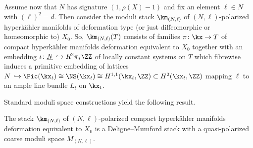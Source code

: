 \subsection{}
Assume now that $N$ has signature $(1,\rho(X)-1)$ and fix an element $\ell\in N$ with $(\ell)^2=d$. Then consider the moduli stack $\km_{(N,\ell)}$ of $(N,\ell)$-polarized hyperk\"ahler manifolds of deformation type (or just diffeomorphic or homeomorphic to) $X_0$. So, $\km_{(N,\ell)}(T)$ consists of families $\pi\colon\kx\to T$ of compact hyperk\"ahler manifolds deformation equivalent to $X_0$ together with an embedding $\iota\colon\underline N\,\hookrightarrow R^2\pi_*\ZZ$ of locally constant systems on $T$ which fibrewise induces a primitive embedding of lattices $N\,\hookrightarrow \Pic(\kx_t)\cong\NS(\kx_t)\cong H^{1,1}(\kx_t,\ZZ)\subset H^2(\kx_t,\ZZ)$ mapping $\ell$ to an ample line bundle $L_t$ on $\kx_t$.

Standard moduli space constructions yield the following result.

\begin{prop}\label{prop:DMcoarse}
The stack $\km_{(N,\ell)}$ of $(N,\ell)$-polarized compact hyperk\"ahler manifolds deformation equivalent to $X_0$ is a Deligne--Mumford stack with a quasi-polarized coarse moduli space $M_{(N,\ell)}$.
\end{prop}


